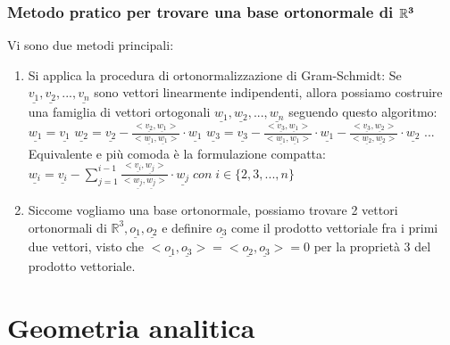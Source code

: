 \documentclass[12pt]{article}
\newenvironment{para}{\begin{adjustwidth}{13mm}{}}{\end{adjustwidth}}
\begin{document}
\begin{para}
\subsubsection{Metodo pratico per trovare una base ortonormale di $\bold{\mathbb{R}^3}$}
Vi sono due metodi principali: \begin{enumerate}
    \item Si applica la procedura di ortonormalizzazione di Gram-Schmidt: Se $\underline{v_1}, \underline{v_2}, ..., \underline{v_n}$ sono vettori linearmente indipendenti, allora possiamo costruire una famiglia di vettori ortogonali $\underline{w_1}, \underline{w_2}, ..., \underline{w_n}$ seguendo questo algoritmo: \newline
    $\underline{w_1} = \underline{v_1}$ \newline
    $\underline{w_2} = \underline{v_2} - \frac{<\underline{v_2}, \underline{w_1}>}{<\underline{w_1}, \underline{w_1}>}\cdot\underline{w_1}$ \newline
    $\underline{w_3} = \underline{v_3} - \frac{<\underline{v_3}, \underline{w_1}>}{<\underline{w_1}, \underline{w_1}>}\cdot\underline{w_1} - \frac{<\underline{v_3}, \underline{w_2}>}{<\underline{w_2}, \underline{w_2}>}\cdot\underline{w_2}$ \newline
    ...\newline
    Equivalente e più comoda è la formulazione compatta: \newline $\underline{w_i} = \underline{v_i} - \sum_{j=1}^{i-1} \frac{<\underline{v_i}, \underline{w_j}>}{<\underline{w_j}, \underline{w_j}>}\cdot\underline{w_j} \; con \; i\in\{2,3,...,n\}$
    \item Siccome vogliamo una base ortonormale, possiamo trovare 2 vettori ortonormali di $\mathbb{R}^3, \underline{o_1}, \underline{o_2}$ e definire $\underline{o_3}$ come il prodotto vettoriale fra i primi due vettori, visto che $<\underline{o_1}, \underline{o_3}> = <\underline{o_2}, \underline{o_3}> = 0$ per la proprietà 3 del prodotto vettoriale.
\end{enumerate}
\section{Geometria analitica}

\end{para}
\end{document}
